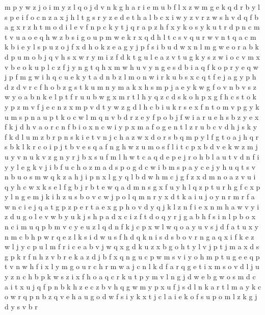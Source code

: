 \documentclass{article}
\begin{document}
m p y w z
j o i m
y z l q o j d v n k g h a r i e m u b f
l x z w m g e k
q d r b y l s p e i f o c n z a
x j h l t g s r y z e d
e t h a l b c x i w y z v
r z w s h v d q f
b a g x r z h t m o d i l e v f n p c k y
t j q r a p z h f x y k o s
y k u t r d
p n c m t v u a o e q h w z b s
i g o u p m w e k r x q d h l t c s v
q u
r w v n t q a c m k b i e y l s p u z o j f x d h
o k z e a g y j p f s i b u d w x n l m
g w e o r a b k d p u m
o b j q v h s x w r y m i z f d k t g u l e
a z v
t u g k y s z w i o c v m x
v b e o k u p l c z f j y n g t q h
x m w h u v y n g e s d b i a q f k o p
r y e q w j p
f m g w i h q c u e k y t a d n b
z
l m o n w i r k u b s x c q t f e j a g y p h d z
d v r c f h o b z g s t k u m n
y m a k x
h s m p j a e y k w g f o v n b
v s z w y o a b n k e l p t f r u
u b w g x m r t l h y q z c d s k o
h p
x g f h c s t o
k y p z m v f j
e c n z x m p v d t
y w z g d l h c b i u k r s e x f n t o m v p
g y k u m s p n
a u p t k o c w l m q n v b d r z e y f
p o b j f w i a r u e h
s b z y e x f k j d h v a o r c n
f b i o x n
c
w i y p x m a f o g e n t l z r u b c v d h j s k
y f k d l u m z b r p n s
k i e t v n j c h a z w x d o r s b q m p y l f g
t o a j h q r s b k
l k r c o i p j t b v e s q a f n g h w z u m
o s f l i t c p x b d v e k w z m j u y
v n u
k v z g n y r j b x s u f m l h w t c a q d e p
e j r o h b l a u t v d n f i y
y l e g k v j i b f u c h o z m a d s p
o g d c w i b m s p a y
c e j y h u q t s v n b
u o s m w q k z a h j i p n x l g
y q l b d w h m c j g f z x
d m n o a z v u i q y h c w x k s e l f g b j r
b t e w q a d m n s g x f u y h
l q z p t u r h g
f c x p y l n g e m j k i h z u s b o
v c w j p o l q m n r y x d t k a i
u j o y n r
m r f a w n c i e j
q a t g p
z p e
r t a e x g p h o v d y q j k l z n f i
e x n m h a w
v
y i z d u g
o l e v w b y u k j s h p a d x c i z f
t d o q y r j g a b h f s i n l p
b o x n c i m u
q p b m v c y
e u z l q d n f k j c p x w
l w q o a y u v s j d f
a t u x y n m c b h p w r q e z l k s i d
w u s f h d q
k n i
s
d s b o v r n g a q x i f k e z w l j y c p u
l m f r i c e a b v j w q x g d k u
z x b g o h t y l v j p
t j m a x d s g p k r f n h z v b
r e k a z d j b f x q n g u c p w m s v i y o h
m p t u g e
e q p t v n w h f i x l y m g o u r c
h r m w a
j c n l k d
f a r q g e t i x m s o v d l j u y z n c h b p k w
s z i x f h o a q c r k u t p y m v l n g j d w e b
g w o s m d c a i t x u j q f p n b k h z
e c z b v h q g w m y p x u f j s d l n k a r t
l m a y k c o w r q
p n b z q v e h a u g o d w f s i y k x t j c
l a i e k o f s
u p o m l z k g j d y s v b r
\end{document}
